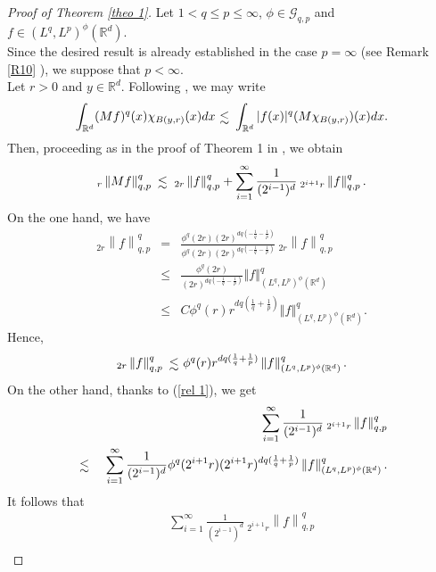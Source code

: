 \documentclass[a4paper,12pt,intlimits,oneside]{amsart}
\numberwithin{equation}{section}
\numberwithin{equation}{section}
\def\lsim{\raisebox{-1ex}{$~\stackrel{\textstyle <}{\sim}~$}}
\theoremstyle{definition}
\begin{document}
\begin{proof}[Proof of Theorem \ref{theo 1}]
Let $1 < q\leq p \leq \infty$, $\phi\in \mathcal{G}_{q,p}$ and $f \in (L^{q},L^{p})^{\phi}(\mathbb{R}^{d}).$\\
Since the desired result is already established in the case $p=\infty$ (see Remark \ref{R10} ), we suppose that $ p < \infty $.\\
Let $r>0$ and $y \in \mathbb{R}^{d}$. Following \cite[Theorem 2.12]{GF}, we may write
\begin{eqnarray}\label{rel 8}
\int_{\mathbb R^{d}} (Mf)^{q}(x) \chi_{B(y,r)}(x) dx \lsim \int_{\mathbb R^{d}} \vert f(x) \vert^{q} (M \chi_{B(y,r)})(x)dx.
\end{eqnarray}
Then, proceeding as in the proof of Theorem 1 in \cite{CF}, we obtain
$$_{r}\left\|Mf\right\|^{q}_{q,p} \lsim \: _{2r}\left\|f\right\|^{q}_{q,p} +  \sum^{\infty}_{i=1} \frac{1}{(2^{i-1})^{d}}  \: _{2^{i+1}r}\left\|f\right\|^{q}_{q,p}.$$
On the one hand, we have
\begin{eqnarray*}
_{2r}\left\|f\right\|^{q}_{q,p} & = & \frac{\phi^{q}(2r)(2r)^{dq(-\frac{1}{q}-\frac{1}{p})}}{\phi^{q}(2r)(2r)^{dq(-\frac{1}{q}-\frac{1}{p})}}   \: _{2r}\left\|f\right\|^{q}_{q,p}\\
&\leq& \frac{\phi^{q}(2r)}{(2r)^{dq(-\frac{1}{q}-\frac{1}{p})}}\left\Vert f \right\Vert^{q}_{(L^{q},L^{p})^{\phi }(\mathbb{R}^{d})}\\
&\leq& C \phi^{q}(r) r^{dq(\frac{1}{q}+\frac{1}{p})} \left\Vert f \right\Vert^{q}_{(L^{q},L^{p})^{\phi }(\mathbb{R}^{d})}.
\end{eqnarray*}
Hence,
\begin{equation}\label{rel 1}
_{2r}\left\|f\right\|^{q}_{q,p} \lsim \phi^{q}(r) r^{dq(\frac{1}{q}+\frac{1}{p})} \left\Vert f \right\Vert^{q}_{(L^{q},L^{p})^{\phi }(\mathbb{R}^{d})}.
\end{equation}
On the other hand, thanks to (\ref{rel 1}), we get
\begin{eqnarray*}
& &\sum^{\infty}_{i=1} \frac{1}{(2^{i-1})^{d}}  \: _{2^{i+1}r}\left\|f\right\|^{q}_{q,p} \\
&\lsim & \sum^{\infty}_{i=1} \frac{1}{(2^{i-1})^{d}} \phi^{q}(2^{i+1}r) (2^{i+1}r)^{dq(\frac{1}{q}+\frac{1}{p})} \left\Vert f \right\Vert^{q}_{(L^{q},L^{p})^{\phi }(\mathbb{R}^{d})}.  
\end{eqnarray*}
It follows that
\begin{eqnarray*}
& &\sum^{\infty}_{i=1} \frac{1}{(2^{i-1})^{d}}  \: _{2^{i+1}r}\left\|f\right\|^{q}_{q,p} \\

\end{eqnarray*}
\end{proof}
\end{document}

